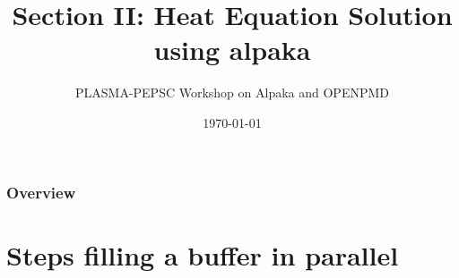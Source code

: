 \documentclass[9pt]{beamer}
\title{Section II: Heat Equation Solution using alpaka} %
\author{PLASMA-PEPSC Workshop on Alpaka and OPENPMD} %
\institute[HZDR] %
{
\\ %
\medskip
\textit{} %
}
\date{\today} %
\begin{document}
\begin{frame}
\titlepage %
\end{frame}


\begin{frame}
\frametitle{Overview} %
\tableofcontents %
\end{frame}

\section{Steps filling a buffer in parallel}
\end{document}
